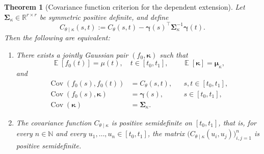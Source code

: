 \documentclass[10pt,a4paper]{amsart}
\newtheorem{theorem}{Theorem}
\DeclareMathOperator{\Cov}{Cov}
\DeclareMathOperator{\E}{\mathbb{E}}
\begin{document}
\begin{theorem}[Covariance function criterion for the dependent extension]\label{thm:appendix-schur}
Let \(\boldsymbol{\Sigma}_{\kappa}\in\mathbb R^{r\times r}\) be symmetric positive definite, and define
\[
C_{\theta\mid\kappa}(s,t):=C_\theta(s,t)-\boldsymbol\gamma(s)^\top\boldsymbol{\Sigma}_{\kappa}^{-1}\boldsymbol{\gamma}(t).
\]
Then the following are equivalent:
\begin{enumerate}
\item There exists a jointly Gaussian pair \((f_0,\boldsymbol{\kappa})\) such that
\[
\E[f_0(t)]=\mu(t),\quad t\in[t_0,t_1],
\qquad
\E[\boldsymbol{\kappa}]=\boldsymbol{\mu}_\kappa,
\]
and
\begin{align*}
\Cov(f_0(s),f_0(t))&=C_\theta(s,t), && s,t\in[t_0,t_1],\\
\Cov(f_0(s),\boldsymbol{\kappa})&=\boldsymbol{\gamma}(s), && s\in[t_0,t_1],\\
\Cov(\boldsymbol{\kappa})&=\boldsymbol{\Sigma}_{\kappa}.
\end{align*}
\item The covariance function \(C_{\theta\mid\kappa}\) is positive semidefinite on \([t_0,t_1]\), that is, for every \(n\in\mathbb{N}\) and every \(u_1,\ldots,u_n\in[t_0,t_1]\), the matrix \(\bigl(C_{\theta\mid\kappa}(u_i,u_j)\bigr)_{i,j=1}^n\) is positive semidefinite.
\end{enumerate}
\end{theorem}
\end{document}
